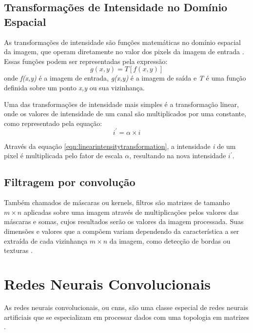 \subsection{Transformações de Intensidade no Domínio Espacial}

As transformações de intensidade são funções matemáticas no domínio espacial da imagem, que operam diretamente no valor dos pixels da imagem de entrada \cite{gonzalez}.
Essas funções podem ser representadas pela expressão:
\begin{equation}
    \label{eqn:intensitytransformation}
    g(x,y) = T\left [ f(x,y) \right ]
\end{equation}
onde \textit{f(x,y)} é a imagem de entrada, \textit{g(x,y)} é a imagem de saída e \textit{T} é uma função definida sobre um ponto \textit{x,y} ou sua vizinhança.

Uma das transformações de intensidade mais simples é a transformação linear, onde os valores de intensidade de um canal são multiplicados por uma constante, como representado pela equação:
\begin{equation}
    \label{eqn:linearintensitytransformation}
    i^{'} = \alpha \times i
\end{equation}

Através da equação \ref{eqn:linearintensitytransformation}, a intensidade \textit{i} de um pixel é multiplicada pelo fator de escala $\alpha$, resultando na nova intensidade  $i^{'}$.

\subsection{Filtragem por convolução}

Também chamados de máscaras ou kernels, filtros são matrizes de tamanho $m \times n$ aplicadas sobre uma imagem através de multiplicações pelos valores das máscaras e somas, cujos resultados serão os valores da imagem processada.
Suas dimensões e valores que a compõem variam dependendo da característica a ser extraída de cada vizinhança $m \times n$ da imagem, como detecção de bordas ou texturas \cite{shapiro}.
\section{Redes Neurais Convolucionais}

As redes neurais convolucionais, ou \acrshort{cnn}s, são uma classe especial de redes neurais artificiais que se especializam em processar dados com uma topologia em matrizes \cite{Goodfellow-et-al-2016}. 

